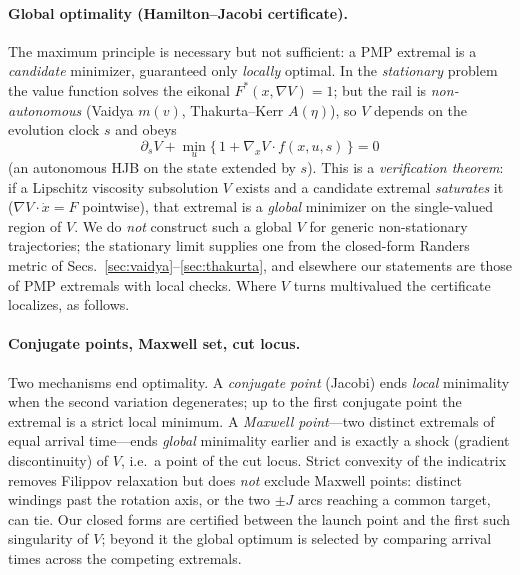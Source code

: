 \documentclass[
    aps, prd, twocolumn, superscriptaddress,
    showpacs, nofootinbib, floatfix
]{revtex4-2}
\begin{document}
\paragraph{Global optimality (Hamilton--Jacobi certificate).} The maximum
principle is necessary but not sufficient: a PMP extremal is a \emph{candidate}
minimizer, guaranteed only \emph{locally} optimal. In the \emph{stationary} problem the
value function solves the eikonal $F^\ast(x,\nabla V)=1$; but the rail is
\emph{non-autonomous} (Vaidya $m(v)$, Thakurta--Kerr $A(\eta)$), so $V$ depends on the
evolution clock $s$ and obeys
\begin{equation}
  \partial_s V+\min_{u}\big\{\,1+\nabla_x V\cdot f(x,u,s)\,\big\}=0
  \label{eq:hjb}
\end{equation}
(an autonomous HJB on the state extended by $s$). This is a \emph{verification theorem}:
if a Lipschitz viscosity subsolution $V$ exists and a candidate extremal \emph{saturates}
it ($\nabla V\cdot\dot x=F$ pointwise), that extremal is a \emph{global} minimizer on the
single-valued region of $V$. We do \emph{not} construct such a global $V$ for generic
non-stationary trajectories; the stationary limit supplies one from the closed-form
Randers metric of Secs.~\ref{sec:vaidya}--\ref{sec:thakurta}, and elsewhere our statements
are those of PMP extremals with local checks. Where $V$ turns multivalued the certificate
localizes, as follows.

\paragraph{Conjugate points, Maxwell set, cut locus.} Two mechanisms end
optimality. A \emph{conjugate point} (Jacobi) ends \emph{local} minimality when
the second variation degenerates; up to the first conjugate point the extremal is
a strict local minimum. A \emph{Maxwell point}---two distinct extremals of equal
arrival time---ends \emph{global} minimality earlier and is exactly a shock
(gradient discontinuity) of $V$, i.e.\ a point of the cut locus. Strict convexity
of the indicatrix removes Filippov relaxation but does \emph{not} exclude Maxwell
points: distinct windings past the rotation axis, or the two $\pm J$ arcs reaching
a common target, can tie. Our closed forms are certified between the launch point
and the first such singularity of $V$; beyond it the global optimum is selected by
comparing arrival times across the competing extremals.
\end{document}
